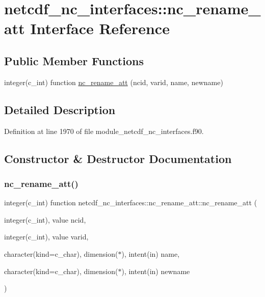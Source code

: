 \hypertarget{interfacenetcdf__nc__interfaces_1_1nc__rename__att}{}\section{netcdf\+\_\+nc\+\_\+interfaces\+:\+:nc\+\_\+rename\+\_\+att Interface Reference}
\label{interfacenetcdf__nc__interfaces_1_1nc__rename__att}
\subsection*{Public Member Functions}
\begin{DoxyCompactItemize}
\item 
integer(c\+\_\+int) function \hyperlink{interfacenetcdf__nc__interfaces_1_1nc__rename__att_a16b8c79185a35881e51f92aac32cf917}{nc\+\_\+rename\+\_\+att} (ncid, varid, name, newname)
\end{DoxyCompactItemize}


\subsection{Detailed Description}


Definition at line 1970 of file module\+\_\+netcdf\+\_\+nc\+\_\+interfaces.\+f90.



\subsection{Constructor \& Destructor Documentation}
\mbox{\label{interfacenetcdf__nc__interfaces_1_1nc__rename__att_a16b8c79185a35881e51f92aac32cf917}} 
\subsubsection{\texorpdfstring{nc\+\_\+rename\+\_\+att()}{nc\_rename\_att()}}
{\footnotesize\ttfamily integer(c\+\_\+int) function netcdf\+\_\+nc\+\_\+interfaces\+::nc\+\_\+rename\+\_\+att\+::nc\+\_\+rename\+\_\+att (\begin{DoxyParamCaption}\item[{integer(c\+\_\+int), value}]{ncid,  }\item[{integer(c\+\_\+int), value}]{varid,  }\item[{character(kind=c\+\_\+char), dimension($\ast$), intent(in)}]{name,  }\item[{character(kind=c\+\_\+char), dimension($\ast$), intent(in)}]{newname }\end{DoxyParamCaption})}



